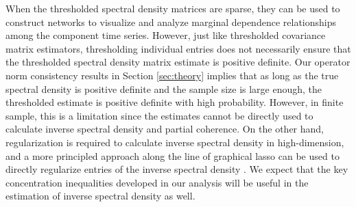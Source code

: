 \smallskip

When the thresholded spectral density matrices are sparse, they can be used to construct networks to visualize and analyze marginal dependence relationships among the component time series. However, just like thresholded covariance matrix estimators, thresholding individual entries does not necessarily ensure that the thresholded spectral density matrix estimate is positive definite. Our operator norm consistency results in Section \ref{sec:theory} implies that as long as the true spectral density is positive definite and the sample size is large enough, the thresholded estimate is positive definite with high probability. However, in finite sample, this is a limitation since the estimates cannot be directly used to calculate inverse spectral density and partial coherence. On the other hand, regularization is required to calculate inverse spectral density in high-dimension, and a more principled approach along the line of graphical lasso can be used to directly regularize entries of the inverse spectral density \citep{jung2015learning, jung2015graphical}. We expect that the key concentration inequalities developed in our analysis will be useful in the estimation of inverse spectral density as well.


\iffalse
In order to take the heterogeneity of cross-spectral density across different coordinates of the spectral density matrix into consideration, we develop a strategy simiilar to adaptive thresholding proposed in \citet{cai2011adaptive}, where the thresholds are  proportional to the variances of the elements at different positions. Formally, the adaptive threshold for position $r,s$ at frequency $\omega_j$ is defined as  
\begin{align*}
    \lambda_{j(r,s)} = \delta_j\sqrt{\frac{\theta_{(r,s)}\text{log }p}{n}}, ~~~~\mbox{ for all $\omega_j$}
\end{align*}
where $\theta_{(k,l)} := Var(\hat{f}_{(k,l)})$ which also needs to be estimated and $\delta_j$ is a tuning parameter. 
\fi
